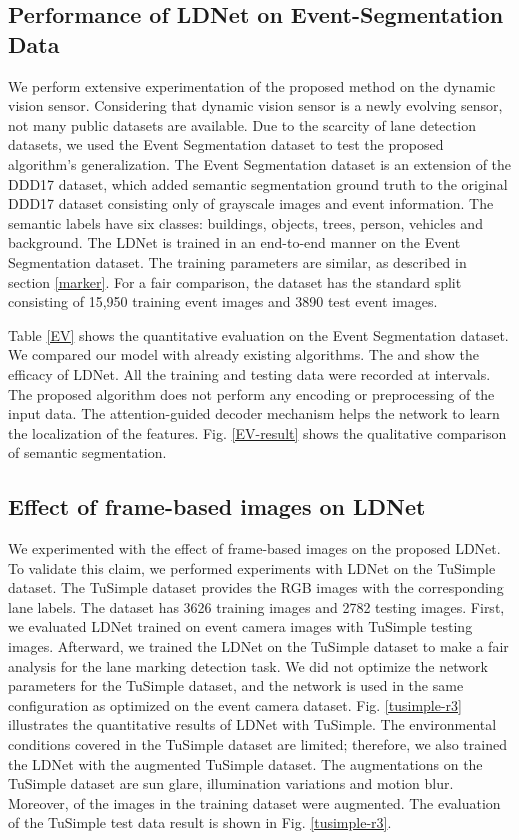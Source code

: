 \documentclass[journal]{IEEEtran}
\begin{document}
\subsection{Performance of LDNet on Event-Segmentation Data}
We perform extensive experimentation of the proposed method on the dynamic vision sensor. Considering that dynamic vision sensor is a newly evolving sensor, not many public datasets are available. Due to the scarcity of lane detection datasets, we used 
the Event Segmentation dataset
 \cite{EVnet} to test the proposed algorithm's generalization. The Event Segmentation dataset is an extension of the DDD17 dataset\cite{24}, which added semantic segmentation ground truth to the original DDD17 dataset consisting only of grayscale images and event information. The semantic labels have six classes: buildings, objects, trees, person, vehicles and background. The LDNet is trained in an end-to-end manner on the Event Segmentation dataset. The training parameters are similar, as described in section \ref{marker}. For a fair comparison, the dataset has the standard split consisting of 15,950 training event images and 3890 test event images.
\par
Table \ref{EV} shows the quantitative evaluation on the Event Segmentation dataset. We compared our model with already existing algorithms. The  and  show the efficacy of LDNet. All the training and testing data were recorded at  intervals. The proposed algorithm does not perform any encoding or preprocessing of the input data. The attention-guided decoder mechanism helps the network to learn the localization of the features. Fig. \ref{EV-result} shows the qualitative comparison of semantic segmentation.   

\subsection{ Effect of frame-based images on LDNet}
We experimented with the effect of frame-based images on the proposed LDNet. To validate this claim, we performed experiments with LDNet on the TuSimple dataset. The TuSimple dataset provides the RGB images with the corresponding lane labels. The dataset has 3626 training images and 2782 testing images. 
First, we evaluated LDNet trained on event camera images with TuSimple testing images. Afterward,  
we trained the LDNet on the TuSimple dataset to make a fair analysis for the lane marking detection task. We did not optimize the network parameters for the TuSimple dataset, and the network is used in the same configuration as optimized on the event camera dataset.  Fig. \ref{tusimple-r3} illustrates the quantitative results of LDNet with TuSimple. The environmental conditions covered in the TuSimple dataset are limited; therefore, we also trained the LDNet with the augmented TuSimple dataset. The augmentations on the TuSimple dataset are sun glare, illumination variations and motion blur. Moreover,  of the images in the training dataset were augmented. The evaluation of the TuSimple test data result is shown in Fig. \ref{tusimple-r3}.
\end{document}
